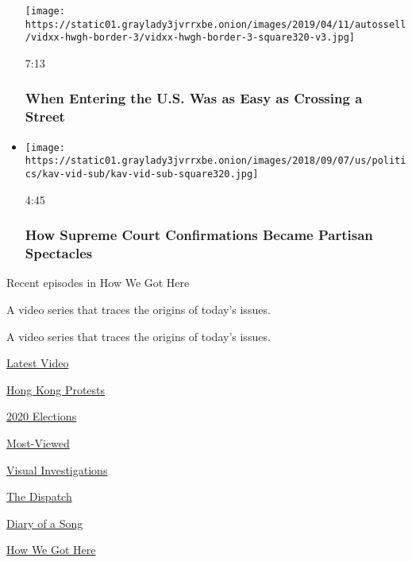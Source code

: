 \begin{itemize}
  \texttt{[image: https://static01.graylady3jvrrxbe.onion/images/2019/04/11/autossell/vidxx-hwgh-border-3/vidxx-hwgh-border-3-square320-v3.jpg]}

  7:13

  \hypertarget{when-entering-the-us-was-as-easy-as-crossing-a-street}{%
  \subsubsection{When Entering the U.S. Was as Easy as Crossing a
  Street}\label{when-entering-the-us-was-as-easy-as-crossing-a-street}}
\item
  \href{https://www.nytimes3xbfgragh.onion/video/us/politics/100000006046278/supreme-court-confirmation-hearing-nominee-senate-history.html?action=click\&module=video-series-bar\&region=header\&pgtype=Article\&playlistId=video/how-we-got-here}{}

  \texttt{[image: https://static01.graylady3jvrrxbe.onion/images/2018/09/07/us/politics/kav-vid-sub/kav-vid-sub-square320.jpg]}

  4:45

  \hypertarget{how-supreme-court-confirmations-became-partisan-spectacles}{%
  \subsubsection{How Supreme Court Confirmations Became Partisan
  Spectacles}\label{how-supreme-court-confirmations-became-partisan-spectacles}}
\end{itemize}

Recent episodes in How We Got Here

A video series that traces the origins of today's issues.

A video series that traces the origins of today's issues.

\href{/video}{}

\href{/video/latest-video}{Latest Video}

\href{/video/hk-protest}{Hong Kong Protests}

\href{/video/2020-Elections}{2020 Elections}

\href{/video/Most-Viewed}{Most-Viewed}

\href{/video/investigations}{Visual Investigations}

\href{/video/on-the-ground}{The Dispatch}

\href{/video/diaryofasong}{Diary of a Song}

\href{/video/how-we-got-here}{How We Got Here}

